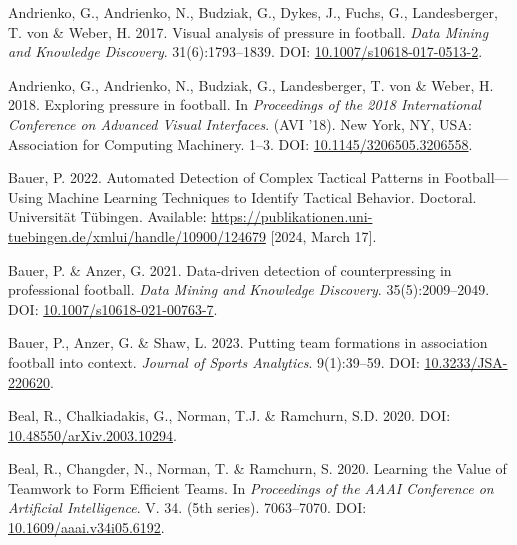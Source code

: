 \documentclass[
  a4paper,
  twoside]{uoe-thesis-template}
\newlength{\cslhangindent}
\newenvironment{CSLReferences}[2] %
 {\begin{list}{}{%
  \setlength{\itemindent}{0pt}
  \setlength{\leftmargin}{0pt}
  \setlength{\parsep}{0pt}
  \ifodd #1
   \setlength{\leftmargin}{\cslhangindent}
   \setlength{\itemindent}{-1\cslhangindent}
  \fi
  \setlength{\itemsep}{#2\baselineskip}}}
 {\end{list}}
\begin{document}
\label{refs}
\begin{CSLReferences}{0}{0}
Andrienko, G., Andrienko, N., Budziak, G., Dykes, J., Fuchs, G.,
Landesberger, T. von \& Weber, H. 2017. Visual analysis of pressure in
football. \emph{Data Mining and Knowledge Discovery}. 31(6):1793--1839.
DOI:
\href{https://doi.org/10.1007/s10618-017-0513-2}{10.1007/s10618-017-0513-2}.

Andrienko, G., Andrienko, N., Budziak, G., Landesberger, T. von \&
Weber, H. 2018. Exploring pressure in football. In \emph{Proceedings of
the 2018 {International} {Conference} on {Advanced} {Visual}
{Interfaces}}. ({AVI} '18). New York, NY, USA: Association for Computing
Machinery. 1--3. DOI:
\href{https://doi.org/10.1145/3206505.3206558}{10.1145/3206505.3206558}.

Bauer, P. 2022. Automated {Detection} of {Complex} {Tactical} {Patterns}
in {Football}---{Using} {Machine} {Learning} {Techniques} to {Identify}
{Tactical} {Behavior}. Doctoral. Universität Tübingen. Available:
\url{https://publikationen.uni-tuebingen.de/xmlui/handle/10900/124679}
{[}2024, March 17{]}.

Bauer, P. \& Anzer, G. 2021. Data-driven detection of counterpressing in
professional football. \emph{Data Mining and Knowledge Discovery}.
35(5):2009--2049. DOI:
\href{https://doi.org/10.1007/s10618-021-00763-7}{10.1007/s10618-021-00763-7}.

Bauer, P., Anzer, G. \& Shaw, L. 2023. Putting team formations in
association football into context. \emph{Journal of Sports Analytics}.
9(1):39--59. DOI:
\href{https://doi.org/10.3233/JSA-220620}{10.3233/JSA-220620}.

Beal, R., Chalkiadakis, G., Norman, T.J. \& Ramchurn, S.D. 2020. DOI:
\href{https://doi.org/10.48550/arXiv.2003.10294}{10.48550/arXiv.2003.10294}.

Beal, R., Changder, N., Norman, T. \& Ramchurn, S. 2020. Learning the
{Value} of {Teamwork} to {Form} {Efficient} {Teams}. In
\emph{Proceedings of the {AAAI} {Conference} on {Artificial}
{Intelligence}}. V. 34. (5th series). 7063--7070. DOI:
\href{https://doi.org/10.1609/aaai.v34i05.6192}{10.1609/aaai.v34i05.6192}.


\end{CSLReferences}
\end{document}
